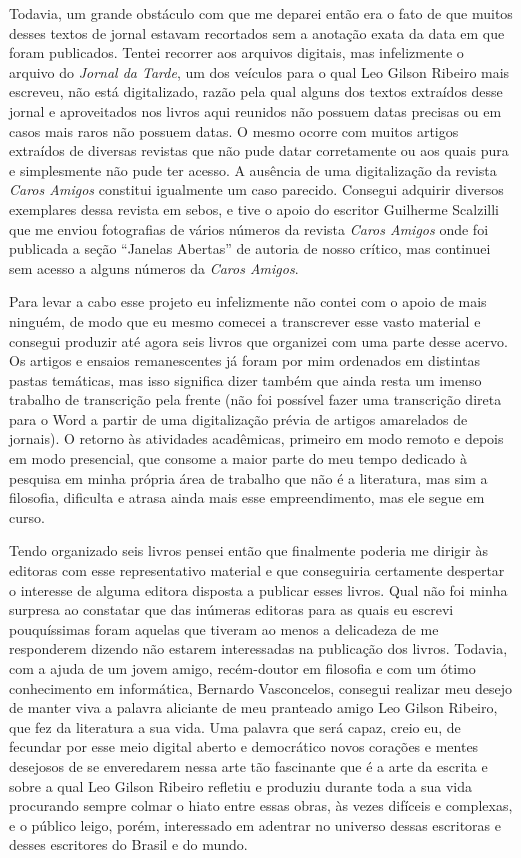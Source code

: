 Todavia, um grande obstáculo com que me deparei então era o fato de que
muitos desses textos de jornal estavam recortados sem a anotação exata
da data em que foram publicados. Tentei recorrer aos arquivos digitais,
mas infelizmente o arquivo do \emph{Jornal da Tarde}, um dos veículos
para o qual Leo Gilson Ribeiro mais escreveu, não está digitalizado,
razão pela qual alguns dos textos extraídos desse jornal e aproveitados
nos livros aqui reunidos não possuem datas precisas ou em casos mais
raros não possuem datas. O mesmo ocorre com muitos artigos extraídos de
diversas revistas que não pude datar corretamente ou aos quais pura e
simplesmente não pude ter acesso. A ausência de uma digitalização da
revista \emph{Caros Amigos} constitui igualmente um caso parecido.
Consegui adquirir diversos exemplares dessa revista em sebos, e tive o
apoio do escritor Guilherme Scalzilli que me enviou fotografias de
vários números da revista \emph{Caros Amigos} onde foi publicada a seção
``Janelas Abertas'' de autoria de nosso crítico, mas continuei sem
acesso a alguns números da \emph{Caros Amigos}.

Para levar a cabo esse projeto eu infelizmente não contei com o apoio de
mais ninguém, de modo que eu mesmo comecei a transcrever esse vasto
material e consegui produzir até agora seis livros que organizei com uma
parte desse acervo. Os artigos e ensaios remanescentes já foram por mim
ordenados em distintas pastas temáticas, mas isso significa dizer também
que ainda resta um imenso trabalho de transcrição pela frente (não foi
possível fazer uma transcrição direta para o Word a partir de uma
digitalização prévia de artigos amarelados de jornais). O retorno às
atividades acadêmicas, primeiro em modo remoto e depois em modo
presencial, que consome a maior parte do meu tempo dedicado à pesquisa
em minha própria área de trabalho que não é a literatura, mas sim a
filosofia, dificulta e atrasa ainda mais esse empreendimento, mas ele
segue em curso.

Tendo organizado seis livros pensei então que finalmente poderia me
dirigir às editoras com esse representativo material e que conseguiria
certamente despertar o interesse de alguma editora disposta a publicar
esses livros. Qual não foi minha surpresa ao constatar que das inúmeras
editoras para as quais eu escrevi pouquíssimas foram aquelas que tiveram
ao menos a delicadeza de me responderem dizendo não estarem interessadas
na publicação dos livros. Todavia, com a ajuda de um jovem amigo,
recém-doutor em filosofia e com um ótimo conhecimento em informática,
Bernardo Vasconcelos, consegui realizar meu desejo de manter viva a
palavra aliciante de meu pranteado amigo Leo Gilson Ribeiro, que fez da
literatura a sua vida. Uma palavra que será capaz, creio eu, de fecundar
por esse meio digital aberto e democrático novos corações e mentes
desejosos de se enveredarem nessa arte tão fascinante que é a arte da
escrita e sobre a qual Leo Gilson Ribeiro refletiu e produziu durante
toda a sua vida procurando sempre colmar o hiato entre essas obras, às
vezes difíceis e complexas, e o público leigo, porém, interessado em
adentrar no universo dessas escritoras e desses escritores do Brasil e
do mundo.

